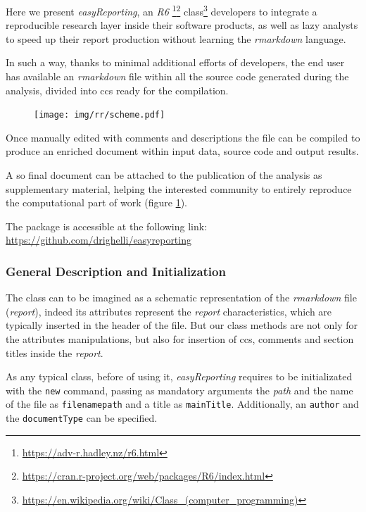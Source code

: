 Here we present \textit{easyReporting}, an \textit{R6} \footnote{\url{https://adv-r.hadley.nz/r6.html}}\footnote{\url{https://cran.r-project.org/web/packages/R6/index.html}} class\footnote{\url{https://en.wikipedia.org/wiki/Class_(computer_programming)}} developers to integrate a reproducible research layer inside their software products, as well as lazy analysts to speed up their report production without learning the \textit{rmarkdown} language.

In such a way, thanks to minimal additional efforts of developers, the end user has available an \textit{rmarkdown} file within all the source code generated during the analysis, divided into \glspl{cc} ready for the compilation.

\begin{figure}[H]
\centering
\texttt{[image: img/rr/scheme.pdf]}
\caption[Reproducible Computational Research illustration]{}
\label{fig:rrscheme}
\end{figure}

Once manually edited with comments and descriptions the file can be compiled to produce an enriched document within input data, source code and output results.

A so final document can be attached to the publication of the analysis as supplementary material, helping the interested community to entirely reproduce the computational part of work (figure \ref{fig:rrscheme}). 

The package is accessible at the following link:\\ \href{https://github.com/drighelli/easyreporting}{https://github.com/drighelli/easyreporting} 

\subsubsection{General Description and Initialization}

The class can to be imagined as a schematic representation of the \textit{rmarkdown} file (\textit{report}), indeed 
its attributes represent the \textit{report} characteristics, which are typically inserted in the header of the file.
But our class methods are not only for the attributes manipulations, but also for insertion of \glspl{cc}, comments and section titles inside the \textit{report}.

As any typical class, before of using it, \textit{easyReporting} requires to be initializated with the \lstinline!new! command, passing as mandatory arguments the \textit{path} and the name of the file as \lstinline!filenamepath! and a title as \lstinline!mainTitle!.
Additionally, an \lstinline!author! and the \lstinline!documentType! can be specified.

